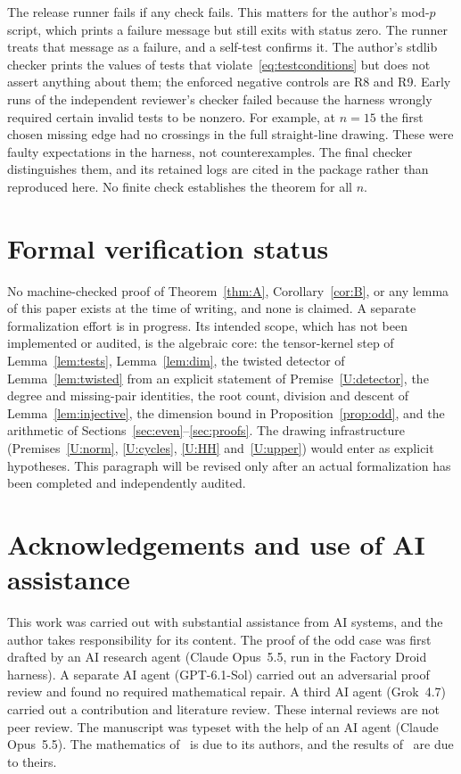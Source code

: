 \documentclass[11pt,a4paper]{article}
\theoremstyle{definition}
\theoremstyle{remark}
\numberwithin{equation}{section}
\begin{document}
The release runner fails if any check fails. This matters for the author's mod-$p$ script, which prints a failure message but still exits with status zero. The runner treats that message as a failure, and a self-test confirms it. The author's stdlib checker prints the values of tests that violate~\eqref{eq:testconditions} but does not assert anything about them; the enforced negative controls are R8 and R9. Early runs of the independent reviewer's checker failed because the harness wrongly required certain invalid tests to be nonzero. For example, at $n=15$ the first chosen missing edge had no crossings in the full straight-line drawing. These were faulty expectations in the harness, not counterexamples. The final checker distinguishes them, and its retained logs are cited in the package rather than reproduced here. No finite check establishes the theorem for all $n$.

\section{Formal verification status}\label{sec:formal}

No machine-checked proof of Theorem~\ref{thm:A}, Corollary~\ref{cor:B}, or any lemma of this paper exists at the time of writing, and none is claimed. A separate formalization effort is in progress. Its intended scope, which has not been implemented or audited, is the algebraic core: the tensor-kernel step of Lemma~\ref{lem:tests}, Lemma~\ref{lem:dim}, the twisted detector of Lemma~\ref{lem:twisted} from an explicit statement of Premise~\ref{U:detector}, the degree and missing-pair identities, the root count, division and descent of Lemma~\ref{lem:injective}, the dimension bound in Proposition~\ref{prop:odd}, and the arithmetic of Sections~\ref{sec:even}--\ref{sec:proofs}. The drawing infrastructure (Premises~\ref{U:norm}, \ref{U:cycles}, \ref{U:HH} and~\ref{U:upper}) would enter as explicit hypotheses. This paragraph will be revised only after an actual formalization has been completed and independently audited.

\section*{Acknowledgements and use of AI assistance}
This work was carried out with substantial assistance from AI systems, and the author takes responsibility for its content. The proof of the odd case was first drafted by an AI research agent (Claude Opus~5.5, run in the Factory Droid harness). A separate AI agent (GPT-6.1-Sol) carried out an adversarial proof review and found no required mathematical repair. A third AI agent (Grok~4.7) carried out a contribution and literature review. These internal reviews are not peer review. The manuscript was typeset with the help of an AI agent (Claude Opus~5.5). The mathematics of~\cite{OAIKn} is due to its authors, and the results of~\cite{OWH,ChiaLee,ZLYC,Sadhu} are due to theirs.
\end{document}
